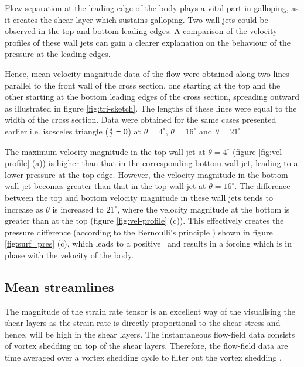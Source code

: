 Flow separation at the leading edge of the body plays a vital part in galloping, as it creates the shear layer which sustains galloping. Two wall jets could be observed in the top and bottom leading edges. A comparison of the velocity profiles of these wall jets can gain a clearer explanation on the behaviour of the pressure at the leading edges.   



Hence, mean velocity magnitude data of the flow were obtained along two lines parallel to the front wall of the cross section, one starting at the top and the other starting at the bottom leading edges of the cross section, spreading outward as illustrated in figure \ref{fig:tri-sketch}. The lengths of these lines were equal to the width of the cross section. Data were obtained for the same cases presented earlier i.e. isosceles triangle ($\frac{d}{l}=0$) at $\theta=4^{\circ}$, $\theta=16^{\circ}$ and $\theta=21^{\circ}$.  







The maximum velocity magnitude in the top wall jet at $\theta= 4^{\circ}$ (figure \ref{fig:vel-profile} (a)) is higher than that in the corresponding bottom wall jet, leading to a lower pressure at the top edge. However, the velocity magnitude in the bottom wall jet becomes greater than that in the top wall jet at $\theta=16^{\circ}$. The difference between the top and bottom velocity magnitude in these wall jets tends to increase as $\theta$ is increased to $21^{\circ}$, where the velocity magnitude at the bottom is greater than at the top (figure \ref{fig:vel-profile} (c)). This effectively creates the pressure difference (according to the Bernoulli's principle ) shown in figure \ref{fig:surf_pres} (c), which leads to a positive \cy\ and results in a forcing which is in phase with the velocity of the body. 






\subsection{Mean streamlines}
\label{sec:streamlines}

The magnitude of the strain rate tensor is an excellent way of the visualising the shear layers as the strain rate is directly proportional to the shear stress and hence, will be high in the shear layers. The instantaneous flow-field data consists of vortex shedding on top of the shear layers. Therefore, the flow-field data are time averaged over a vortex shedding cycle to filter out the vortex shedding . 

